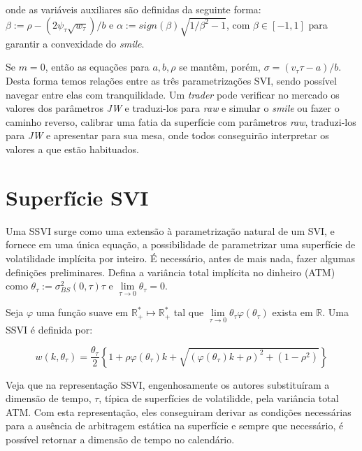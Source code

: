 \documentclass[]{book}
\theoremstyle{definition}
\theoremstyle{definition}
\theoremstyle{definition}
\theoremstyle{remark}
\let\BeginKnitrBlock\begin \let\EndKnitrBlock\end
\begin{document}
onde as variáveis auxiliares são definidas da seguinte forma:
\(\beta:=\rho-(2\psi_\tau\sqrt{w_\tau})/b\) e
\(\alpha:=sign(\beta)\sqrt{1/\beta^2 - 1}\), com \(\beta \in [-1, 1]\)
para garantir a convexidade do \emph{smile}.

Se \(m=0\), então as equações para \(a, b, \rho\) se mantêm, porém,
\(\sigma = (v_\tau \tau-a)/b\). Desta forma temos relações entre as três
parametrizações SVI, sendo possível navegar entre elas com
tranquilidade. Um \emph{trader} pode verificar no mercado os valores dos
parâmetros \emph{JW} e traduzi-los para \emph{raw} e simular o
\emph{smile} ou fazer o caminho reverso, calibrar uma fatia da
superfície com parâmetros \emph{raw}, traduzi-los para \emph{JW} e
apresentar para sua mesa, onde todos conseguirão interpretar os valores
a que estão habituados.

\section{Superfície SVI}\label{superficie-svi}

Uma SSVI surge como uma extensão à parametrização natural de um SVI, e
fornece em uma única equação, a possibilidade de parametrizar uma
superfície de volatilidade implícita por inteiro. É necessário, antes de
mais nada, fazer algumas definições preliminares. Defina a variância
total implícita no dinheiro (ATM) como
\(\theta_\tau:=\sigma_{BS}^2(0, \tau)\tau\) e
\(\lim\limits_{\tau\rightarrow 0}\theta_\tau = 0\).

\BeginKnitrBlock{definition}
\protect\hypertarget{def:ssvi}{}{\label{def:ssvi} }Seja \(\varphi\) uma
função suave em \(\mathbb R_+^*\mapsto \mathbb R_+^*\) tal que
\(\lim\limits_{\tau\rightarrow 0}\theta_\tau \varphi(\theta_\tau)\)
exista em \(\mathbb R\). Uma SSVI é definida por:
\EndKnitrBlock{definition}

\begin{equation}
w(k, \theta_\tau)=\frac{\theta_\tau}{2}\left\lbrace 1+\rho\varphi(\theta_\tau)k+\sqrt{(\varphi(\theta_\tau)k+\rho)^2+(1-\rho^2)} \right\rbrace
\label{eq:ssvi}
\end{equation}

Veja que na representação SSVI, engenhosamente os autores substituíram a
dimensão de tempo, \(\tau\), típica de superfícies de volatilidde, pela
variância total ATM. Com esta representação, eles conseguiram derivar as
condições necessárias para a ausência de arbitragem estática na
superfície e sempre que necessário, é possível retornar a dimensão de
tempo no calendário.
\end{document}
